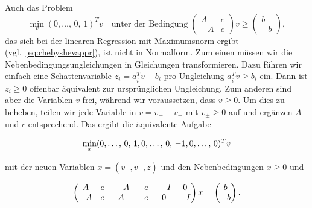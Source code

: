 Auch das Problem
\begin{equation}
  \min_v (0,\ldots,\,0,\,1)^T v\quad\text{unter der Bedingung}\;
  \begin{pmatrix}
    A & e\\
    -A & e
  \end{pmatrix} v \ge
  \begin{pmatrix}
    b\\
    -b
  \end{pmatrix},
\end{equation}
das sich bei der linearen Regression mit Maximumsnorm ergibt
(vgl.~\eqref{eq:chebyshevappr}), ist nicht in Normalform. Zum einen
müssen wir die Nebenbedingungsungleichungen in Gleichungen
transformieren. Dazu führen wir einfach eine Schattenvariable
$z_i=a_i^Tv - b_i$ pro Ungleichung $a_i^Tv\ge b_i$ ein. Dann ist
$z_i\ge 0$ offenbar äquivalent zur ursprünglichen Ungleichung. Zum
anderen sind aber die Variablen $v$ frei, während wir voraussetzen,
dass $v\ge 0$. Um dies zu beheben, teilen wir jede Variable in $v=v_+
- v_-$ mit $v_\pm\ge 0$ auf und ergänzen $A$ und $c$ entsprechend. Das
ergibt die äquivalente Aufgabe%
{\samepage\vspace{0.2em}%
  \begin{equation}
    \label{eq:chebyshevapprnf}
    \min_x (\tikzlabel{vpl}0,\ldots,\,0,\,1\tikzlabel{vpr},
    \tikzlabel{vml}0,\ldots,\,0,\,-1\tikzlabel{vmr},
    \tikzlabel{zl}0,\ldots,\,0\tikzlabel{zr})^T v
  \end{equation}
  }
mit der neuen Variablen $x=(v_+,v_-,z)$ und den Nebenbedingungen $x\ge 0$
und
{\samepage\vspace{0.2em}%
\begin{equation*}
  \begin{pmatrix}
    \tikzlabel{vpl}A  & e\tikzlabel{vpr} & 
    \tikzlabel{vml}-A & -e\tikzlabel{vmr} &
    \tikzlabel{zl} -I & 0\tikzlabel{zr}\\
    -A & e &  A & -e & 0 & -I
  \end{pmatrix}
  x =
  \begin{pmatrix}
    b\\
    -b
  \end{pmatrix}.
\end{equation*}
}

